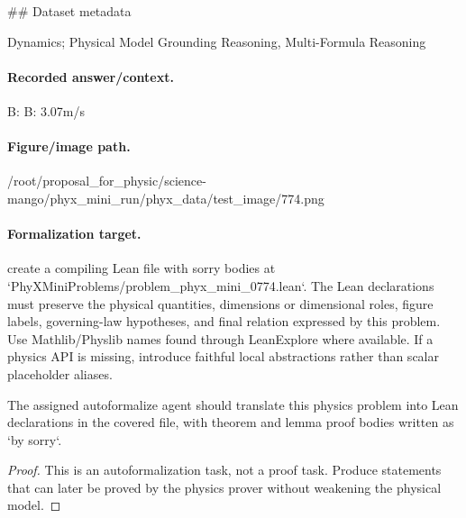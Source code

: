 \#\# Dataset metadata

Dynamics; Physical Model Grounding Reasoning, Multi-Formula Reasoning

\paragraph{Recorded answer/context.}
B: B: 3.07m/s

\paragraph{Figure/image path.}
/root/proposal\_for\_physic/science-mango/phyx\_mini\_run/phyx\_data/test\_image/774.png

\paragraph{Formalization target.}
create a compiling Lean file with sorry bodies at `PhyXMiniProblems/problem\_phyx\_mini\_0774.lean`. The Lean declarations must preserve the physical quantities, dimensions or dimensional roles, figure labels, governing-law hypotheses, and final relation expressed by this problem.
Use Mathlib/Physlib names found through LeanExplore where available. If a physics API is missing, introduce faithful local abstractions rather than scalar placeholder aliases.

\begin{theorem}
\label{thm:physics:phyx_mini_0774:target}
The assigned autoformalize agent should translate this physics problem into Lean declarations in the covered file, with theorem and lemma proof bodies written as `by sorry`.
\end{theorem}
\begin{proof}
This is an autoformalization task, not a proof task. Produce statements that can later be proved by the physics prover without weakening the physical model.
\end{proof}

